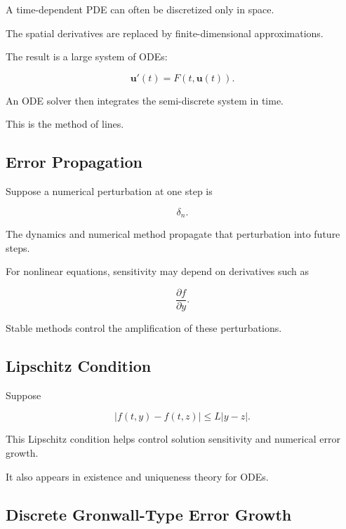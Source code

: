 A time-dependent PDE can often be discretized only in space.

The spatial derivatives are replaced by finite-dimensional
approximations.

The result is a large system of ODEs:

\[
\boxed{
\mathbf{u}'(t)
=
F(t,\mathbf{u}(t)).
}
\]

An ODE solver then integrates the semi-discrete system in time.

This is the method of lines.

\subsection{Error Propagation}
\label{subsec:ode-error-propagation}

Suppose a numerical perturbation at one step is

\[
\delta_n.
\]

The dynamics and numerical method propagate that perturbation into future
steps.

For nonlinear equations, sensitivity may depend on derivatives such as

\[
\boxed{
\frac{\partial f}{\partial y}.
}
\]

Stable methods control the amplification of these perturbations.

\subsection{Lipschitz Condition}
\label{subsec:ode-lipschitz-numerical}

Suppose

\[
\boxed{
|f(t,y)-f(t,z)|
\leq
L|y-z|.
}
\]

This Lipschitz condition helps control solution sensitivity and numerical
error growth.

It also appears in existence and uniqueness theory for ODEs.

\subsection{Discrete Gronwall-Type Error Growth}
\label{subsec:discrete-gronwall-ode}

